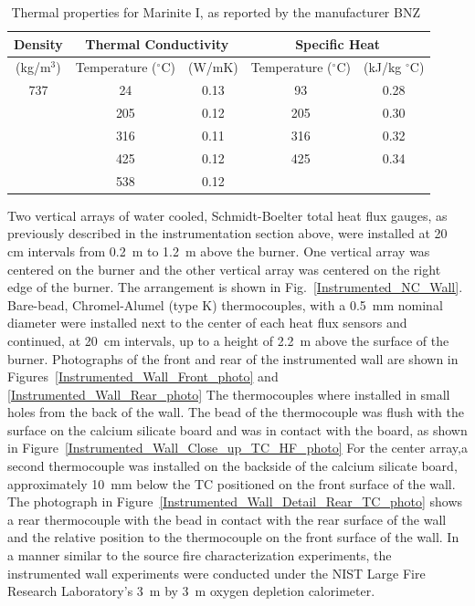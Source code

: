 \documentclass[twoside]{uocthesis}
\begin{document}
{\begin{table}
	\centering
\begin{tabular}{|c|c|c|c|c|}
	\hline Density & \multicolumn{2}{c|}{Thermal Conductivity} & \multicolumn{2}{c|}{Specific Heat}   \\
	\hline (kg/m$^3$) & Temperature ($^\circ$C) & (W/mK)  & Temperature ($^\circ$C)  & (kJ/kg $^\circ$C) \\ \hline
	\hline 737  & 24 & 0.13 & 93 & 0.28 \\
	\hline  & 205 & 0.12  & 205 & 0.30 \\
	\hline  & 316 & 0.11 & 316 & 0.32 \\
	\hline  & 425 & 0.12 & 425 & 0.34 \\
	\hline  & 538 & 0.12 &  &  \\
	\hline
\end{tabular}
\caption[Thermal properties for Marinite I]{Thermal properties for Marinite I, as reported by the manufacturer BNZ~\cite{Marinite:1997}}
\label{tab:Marinite_Thermal_Properties}
\end{table}

Two vertical arrays of water cooled, Schmidt-Boelter total heat flux gauges, as previously described in the instrumentation section above, were installed at 20 cm intervals from 0.2~m to 1.2~m above the burner.  One vertical array was centered on the burner and the other vertical array was centered on the right edge of the burner. The arrangement is shown in Fig.~\ref{Instrumented_NC_Wall}. Bare-bead, Chromel-Alumel (type K) thermocouples, with a 0.5~mm nominal diameter were installed next to the center of each heat flux sensors and continued, at 20~cm intervals, up to a height of 2.2~m above the surface of the burner. Photographs of the front and rear of the instrumented wall are shown in Figures~\ref{Instrumented_Wall_Front_photo} and \ref{Instrumented_Wall_Rear_photo} The thermocouples where installed in small holes from the back of the wall.  The bead of the thermocouple was flush with the surface on the calcium silicate board and was in contact with the board, as shown in Figure~\ref{Instrumented_Wall_Close_up_TC_HF_photo} For the center array,a second thermocouple was installed on the backside of the calcium silicate board, approximately 10~mm below the TC positioned on the front surface of the wall. The photograph in Figure~\ref{Instrumented_Wall_Detail_Rear_TC_photo} shows a rear thermocouple with the bead in contact with the rear surface of the wall and the relative position to the thermocouple on the front surface of the wall. In a manner similar to the source fire characterization experiments, the instrumented wall experiments were conducted under the NIST Large Fire Research Laboratory's 3~m by 3~m oxygen depletion calorimeter.

}
\end{document}

